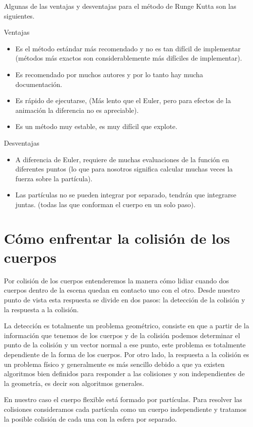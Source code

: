 Algunas de las ventajas y desventajas para el método de Runge Kutta son las siguientes.

Ventajas
\begin{itemize}
\item Es el método estándar más recomendado y no es tan difícil de implementar (métodos más exactos son considerablemente más difíciles de implementar).
\item Es recomendado por muchos autores y por lo tanto hay mucha documentación.
\item Es rápido de ejecutarse, (Más lento que el Euler, pero para efectos de la animación la diferencia no es apreciable).
\item Es un método muy estable, es muy difícil que explote.
\end{itemize}

Desventajas
\begin{itemize}
\item A diferencia de Euler, requiere de muchas evaluaciones de la función en diferentes puntos (lo que para nosotros significa calcular muchas veces la fuerza sobre la partícula).
\item Las partículas no se pueden integrar por separado, tendrán que integrarse juntas. (todas las que conforman el cuerpo en un solo paso).
\end{itemize}

\section{Cómo enfrentar la colisión de los cuerpos}
Por colisión de los cuerpos entenderemos la manera cómo lidiar cuando dos cuerpos dentro de la escena quedan en contacto uno con el otro.
Desde nuestro punto de vista esta respuesta se divide en dos pasos: la detección de la colisión y la respuesta a la colisión.

La detección es totalmente un problema geométrico, consiste en que a partir de la información que tenemos de los cuerpos y de la colisión podemos determinar el punto de la colisión y un vector normal a ese punto, este problema es totalmente dependiente de la forma de los cuerpos.
Por otro lado, la respuesta a la colisión es un problema físico y generalmente es más sencillo debido a que ya existen algoritmos bien definidos para responder a las colisiones y son independientes de la geometría, es decir son algoritmos generales.

En nuestro caso el cuerpo flexible está formado por partículas.
Para resolver las colisiones consideramos cada partícula como un cuerpo independiente y tratamos la posible colisión de cada una con la esfera por separado.

